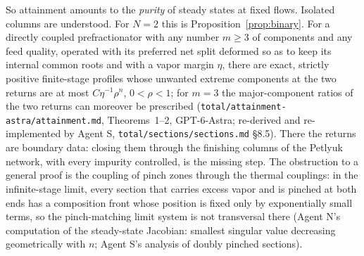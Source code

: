 So attainment amounts to the \emph{purity} of steady states at fixed flows. Isolated columns are understood. For
$N=2$ this is Proposition~\ref{prop:binary}. For a directly coupled prefractionator with any number $m\ge3$ of
components and any feed quality, operated with its preferred net split deformed so as to keep its internal common
roots and with a vapor margin $\eta$, there are exact, strictly positive finite-stage profiles whose unwanted extreme
components at the two returns are at most $C\eta^{-1}\rho^n$, $0<\rho<1$; for $m=3$ the major-component ratios of the two
returns can moreover be prescribed (\texttt{total/attainment-astra/attainment.md}, Theorems~1--2, GPT-6-Astra; re-derived and
re-implemented by Agent S, \texttt{total/sections/sections.md} \S8.5). There the returns are boundary data: closing them through the finishing columns
of the Petlyuk network, with every impurity controlled, is the missing step. The obstruction to a general proof is the coupling
of pinch zones through the thermal couplings: in the infinite-stage limit, every section that carries excess vapor and
is pinched at both ends has a composition front whose position is fixed only by exponentially small terms, so the
pinch-matching limit system is not transversal there (Agent N's computation of the steady-state Jacobian:
smallest singular value decreasing geometrically with $n$; Agent S's analysis of doubly pinched sections).

